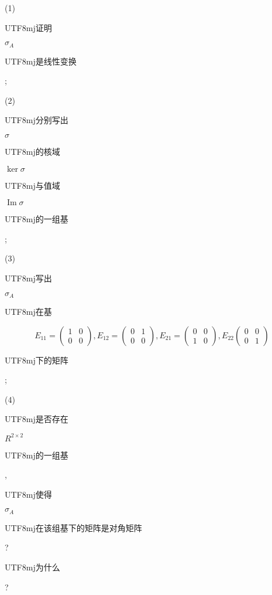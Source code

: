 \documentclass[10pt]{article}
\begin{document}
(1) \begin{CJK}{UTF8}{mj}证明\end{CJK} $\sigma_{A}$ \begin{CJK}{UTF8}{mj}是线性变换\end{CJK};

(2) \begin{CJK}{UTF8}{mj}分别写出\end{CJK} $\sigma$ \begin{CJK}{UTF8}{mj}的核域\end{CJK} $\operatorname{ker} \sigma$ \begin{CJK}{UTF8}{mj}与值域\end{CJK} $\operatorname{Im} \sigma$ \begin{CJK}{UTF8}{mj}的一组基\end{CJK};

(3) \begin{CJK}{UTF8}{mj}写出\end{CJK} $\sigma_{A}$ \begin{CJK}{UTF8}{mj}在基\end{CJK}
$$
E_{11}=\left(\begin{array}{ll}
1 & 0 \\
0 & 0
\end{array}\right), E_{12}=\left(\begin{array}{ll}
0 & 1 \\
0 & 0
\end{array}\right), E_{21}=\left(\begin{array}{ll}
0 & 0 \\
1 & 0
\end{array}\right), E_{22}\left(\begin{array}{ll}
0 & 0 \\
0 & 1
\end{array}\right)
$$
\begin{CJK}{UTF8}{mj}下的矩阵\end{CJK};

(4) \begin{CJK}{UTF8}{mj}是否存在\end{CJK} $R^{2 \times 2}$ \begin{CJK}{UTF8}{mj}的一组基\end{CJK}, \begin{CJK}{UTF8}{mj}使得\end{CJK} $\sigma_{A}$ \begin{CJK}{UTF8}{mj}在该组基下的矩阵是对角矩阵\end{CJK}? \begin{CJK}{UTF8}{mj}为什么\end{CJK}?
\end{document}
